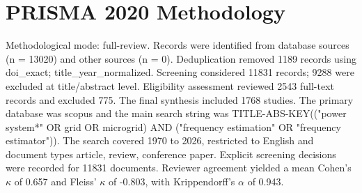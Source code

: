 \section*{PRISMA 2020 Methodology}
Methodological mode: full-review.
Records were identified from database sources (n = 13020) and other sources (n = 0). 
Deduplication removed 1189 records using doi\_exact; title\_year\_normalized.
Screening considered 11831 records; 9288 were excluded at title/abstract level. 
Eligibility assessment reviewed 2543 full-text records and excluded 775. 
The final synthesis included 1768 studies.
 The primary database was scopus and the main search string was TITLE-ABS-KEY(("power system*" OR grid OR microgrid) AND ("frequency estimation" OR "frequency estimator")).
 The search covered 1970 to 2026, restricted to English and document types article, review, conference paper.
 Explicit screening decisions were recorded for 11831 documents.
 Reviewer agreement yielded a mean Cohen's $\kappa$ of 0.657 and Fleiss' $\kappa$ of -0.803, with Krippendorff's $\alpha$ of 0.943.
